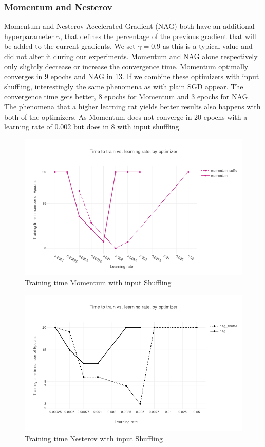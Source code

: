 \subsubsection{Momentum and Nesterov}
Momentum and  Nesterov Accelerated Gradient (NAG) \citep{nag} both have an additional hyperparameter $\gamma$, that defines the percentage of the previous gradient that will be added to the current gradients. We set $\gamma = 0.9$ as this is a typical value and did not alter it during our experiments. Momentum and NAG alone respectively only slightly decrease or increase the convergence time. Momentum optimally converges in 9 epochs and NAG in 13. If we combine these optimizers with input shuffling, interestingly the same phenomena as with plain SGD appear. The convergence time gets better, 8 epochs for Momentum and 3 epochs for NAG. The phenomena that a higher learning rat yields better results also happens with both of the optimizers. As Momentum does not converge in 20 epochs with a learning rate of 0.002 but does in 8 with input shuffling.
\begin{figure}[h]
\centering

\includegraphics[scale=0.3]{images/results_mom_shuffle}
\caption{Training time Momentum with input Shuffling}
\label{fig:results_mom}
\end{figure}

\begin{figure}[h]
\centering
\includegraphics[scale=0.3]{images/results_nag_shuffle}
\caption{Training time Nesterov with input Shuffling}
\label{fig:results_nag}
\end{figure}


